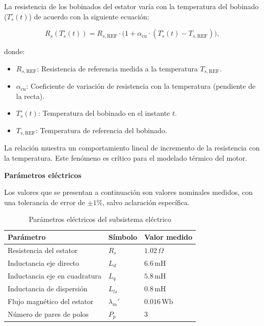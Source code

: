 \documentclass{article}
\begin{document}
La resistencia de los bobinados del estator varía con la temperatura del bobinado (\(T_s^\circ(t)\)) de acuerdo con la siguiente ecuación:

\begin{equation}
    R_s(T_s^\circ(t)) = R_{s, \text{REF}} \cdot \Big( 1 + \alpha_\text{cu} \cdot (T_s^\circ(t) - T_{s, \text{REF}}) \Big),
\end{equation}

donde:
\begin{itemize}
    \item \(R_{s, \text{REF}}\): Resistencia de referencia medida a la temperatura \(T_{s, \text{REF}}\).
    \item \(\alpha_\text{cu}\): Coeficiente de variación de resistencia con la temperatura (pendiente de la recta).
    \item \(T_s^\circ(t)\): Temperatura del bobinado en el instante \(t\).
    \item \(T_{s, \text{REF}}\): Temperatura de referencia del bobinado.
\end{itemize}

La relación muestra un comportamiento lineal de incremento de la resistencia con la temperatura. Este fenómeno es crítico para el modelado térmico del motor.


\textbf{Parámetros eléctricos}

Los valores que se presentan a continuación son valores nominales medidos, con una tolerancia de error de \(\pm 1\%\), salvo aclaración específica.

\begin{table}[H]
\centering
\label{tabla_parametros_electricos}
\begin{tabular}{|l|l|l|}
\hline
\textbf{Parámetro} & \textbf{Símbolo} & \textbf{Valor medido} \\ \hline
Resistencia del estator & $R_s$ & $1.02 \, \Omega$ \\ \hline
Inductancia eje directo & $L_d$ & $6.6 \, \text{mH}$ \\ \hline
Inductancia eje en cuadratura & $L_q$ & $5.8 \, \text{mH}$ \\ \hline
Inductancia de dispersión & $L_{ls}$ & $0.8 \, \text{mH}$ \\ \hline
Flujo magnético del estator & $\lambda_m'$ & $0.016 \, \text{Wb}$ \\ \hline
Número de pares de polos & $P_p$ & $3$ \\ \hline
\end{tabular}
\caption{Parámetros eléctricos del subsistema eléctrico}
\end{table}
\end{document}
